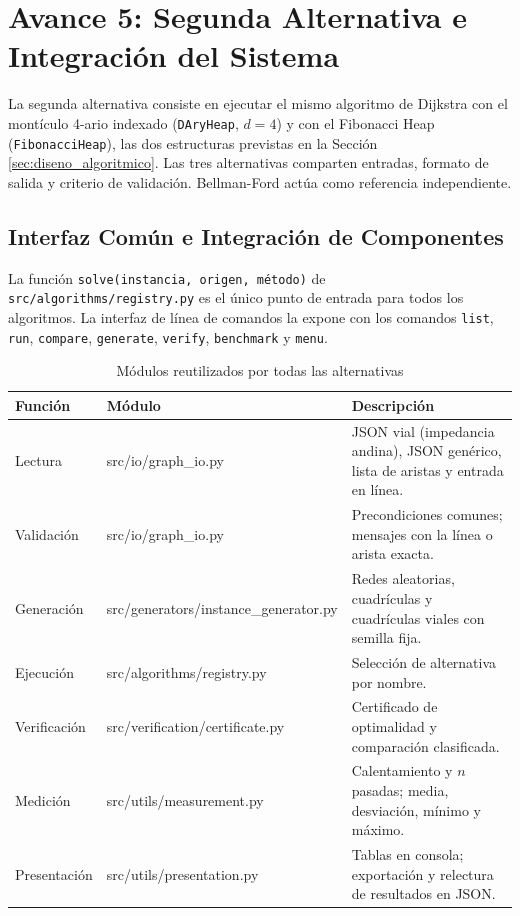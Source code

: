 \section{Avance 5: Segunda Alternativa e Integración del Sistema}
\label{sec:avance5}

La segunda alternativa consiste en ejecutar el mismo algoritmo de Dijkstra con el montículo 4-ario indexado (\texttt{DAryHeap}, $d=4$) y con el Fibonacci Heap (\texttt{FibonacciHeap}), las dos estructuras previstas en la Sección \ref{sec:diseno_algoritmico}. Las tres alternativas comparten entradas, formato de salida y criterio de validación. Bellman-Ford actúa como referencia independiente.

\subsection{Interfaz Común e Integración de Componentes}
La función \texttt{solve(instancia, origen, método)} de \texttt{src/algorithms/registry.py} es el único punto de entrada para todos los algoritmos. La interfaz de línea de comandos la expone con los comandos \texttt{list}, \texttt{run}, \texttt{compare}, \texttt{generate}, \texttt{verify}, \texttt{benchmark} y \texttt{menu}.

\begin{table}[H]
    \caption{Módulos reutilizados por todas las alternativas}
    \label{tab:modulos_reutilizados}
    \begin{tabularx}{\textwidth}{@{}>{\raggedright\arraybackslash}p{2.4cm}>{\ttfamily\small\raggedright\arraybackslash}p{4.6cm}X@{}}
        \toprule
        \textbf{Función} & \textbf{Módulo} & \textbf{Descripción} \\
        \midrule
        Lectura & src/io/\allowbreak graph\_io.py & JSON vial (impedancia andina), JSON genérico, lista de aristas y entrada en línea. \\
        Validación & src/io/\allowbreak graph\_io.py & Precondiciones comunes; mensajes con la línea o arista exacta. \\
        Generación & src/generators/\allowbreak instance\_generator.py & Redes aleatorias, cuadrículas y cuadrículas viales con semilla fija. \\
        Ejecución & src/algorithms/\allowbreak registry.py & Selección de alternativa por nombre. \\
        Verificación & src/verification/\allowbreak certificate.py & Certificado de optimalidad y comparación clasificada. \\
        Medición & src/utils/\allowbreak measurement.py & Calentamiento y $n$ pasadas; media, desviación, mínimo y máximo. \\
        Presentación & src/utils/\allowbreak presentation.py & Tablas en consola; exportación y relectura de resultados en JSON. \\
        \bottomrule
    \end{tabularx}
\end{table}

